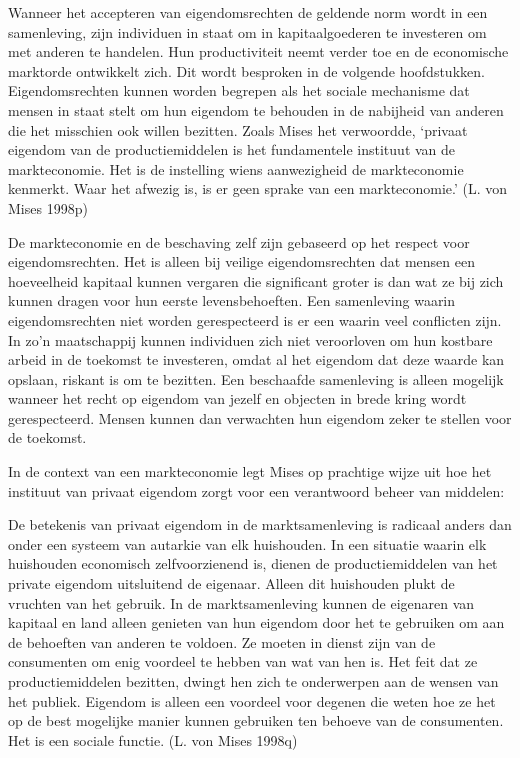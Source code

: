 \documentclass[
  a5paper,
  smalldemyvopaper,11pt,twoside,onecolumn,openright,extrafontsizes,
hidelinks]{memoir}
\begin{document}
Wanneer het accepteren van eigendomsrechten de geldende norm wordt in
een samenleving, zijn individuen in staat om in kapitaalgoederen te
investeren om met anderen te handelen. Hun productiviteit neemt verder
toe en de economische marktorde ontwikkelt zich. Dit wordt besproken in
de volgende hoofdstukken. Eigendomsrechten kunnen worden begrepen als
het sociale mechanisme dat mensen in staat stelt om hun eigendom te
behouden in de nabijheid van anderen die het misschien ook willen
bezitten. Zoals Mises het verwoordde, `privaat eigendom van de
productiemiddelen is het fundamentele instituut van de markteconomie.
Het is de instelling wiens aanwezigheid de markteconomie kenmerkt. Waar
het afwezig is, is er geen sprake van een markteconomie.' (L. von Mises
1998p)

De markteconomie en de beschaving zelf zijn gebaseerd op het respect
voor eigendomsrechten. Het is alleen bij veilige eigendomsrechten dat
mensen een hoeveelheid kapitaal kunnen vergaren die significant groter
is dan wat ze bij zich kunnen dragen voor hun eerste levensbehoeften.
Een samenleving waarin eigendomsrechten niet worden gerespecteerd is er
een waarin veel conflicten zijn. In zo'n maatschappij kunnen individuen
zich niet veroorloven om hun kostbare arbeid in de toekomst te
investeren, omdat al het eigendom dat deze waarde kan opslaan, riskant
is om te bezitten. Een beschaafde samenleving is alleen mogelijk wanneer
het recht op eigendom van jezelf en objecten in brede kring wordt
gerespecteerd. Mensen kunnen dan verwachten hun eigendom zeker te
stellen voor de toekomst.

In de context van een markteconomie legt Mises op prachtige wijze uit
hoe het instituut van privaat eigendom zorgt voor een verantwoord beheer
van middelen:

De betekenis van privaat eigendom in de marktsamenleving is radicaal
anders dan onder een systeem van autarkie van elk huishouden. In een
situatie waarin elk huishouden economisch zelfvoorzienend is, dienen de
productiemiddelen van het private eigendom uitsluitend de eigenaar.
Alleen dit huishouden plukt de vruchten van het gebruik. In de
marktsamenleving kunnen de eigenaren van kapitaal en land alleen
genieten van hun eigendom door het te gebruiken om aan de behoeften van
anderen te voldoen. Ze moeten in dienst zijn van de consumenten om enig
voordeel te hebben van wat van hen is. Het feit dat ze productiemiddelen
bezitten, dwingt hen zich te onderwerpen aan de wensen van het publiek.
Eigendom is alleen een voordeel voor degenen die weten hoe ze het op de
best mogelijke manier kunnen gebruiken ten behoeve van de consumenten.
Het is een sociale functie. (L. von Mises 1998q)
\end{document}
